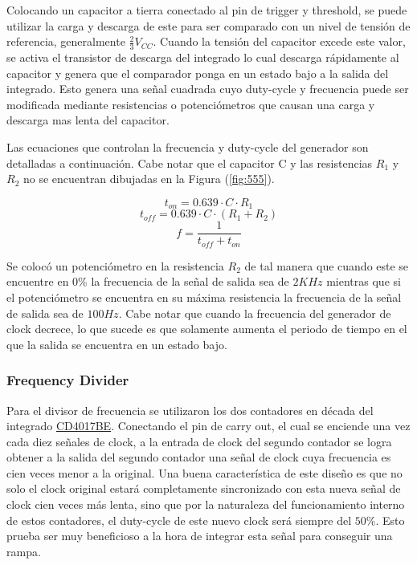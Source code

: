 Colocando un capacitor a tierra conectado al pin de trigger y threshold, se puede utilizar la carga y descarga de este para ser comparado con un nivel de tensión de referencia, generalmente $\frac{2}{3} V_{CC}$. Cuando la tensión del capacitor excede este valor, se activa el transistor de descarga del integrado lo cual descarga rápidamente al capacitor y genera que el comparador ponga en un estado bajo a la salida del integrado. Esto genera una señal cuadrada cuyo duty-cycle y frecuencia puede ser modificada mediante resistencias o potenciómetros que causan una carga y descarga mas lenta del capacitor. 

Las ecuaciones que controlan la frecuencia y duty-cycle del generador son detalladas a continuación. Cabe notar que el capacitor C y las resistencias $R_1$ y $R_2$ no se encuentran dibujadas en la Figura (\ref{fig:555}).

\begin{equation}
t_{on} = 0.639\cdot C \cdot R_1
\end{equation}
\begin{equation}
t_{off} = 0.639 \cdot C \cdot (R_1 + R_2)
\end{equation}
\begin{equation}
f=\frac{1}{t_{off} + t_{on}}
\end{equation}

Se colocó un potenciómetro en la resistencia $R_2$ de tal manera que cuando este se encuentre en $0\%$ la frecuencia de la señal de salida sea de $2KHz$ mientras que si el potenciómetro se encuentra en su máxima resistencia la frecuencia de la señal de salida sea de $100Hz$. Cabe notar que cuando la frecuencia del generador de clock decrece, lo que sucede es que solamente aumenta el periodo de tiempo en el que la salida se encuentra en un estado bajo.

\subsubsection{Frequency Divider}

Para el divisor de frecuencia se utilizaron los dos contadores en década del integrado \href{http://www.ti.com/lit/ds/symlink/cd4017b.pdf}{CD4017BE}. Conectando el pin de carry out, el cual se enciende una vez cada diez señales de clock, a la entrada de clock del segundo contador se logra obtener a la salida del segundo contador una señal de clock cuya frecuencia es cien veces menor a la original. Una buena característica de este diseño es que no solo el clock original estará completamente sincronizado con esta nueva señal de clock cien veces más lenta, sino que por la naturaleza del funcionamiento interno de estos contadores, el duty-cycle de este nuevo clock será siempre del $50\%$. Esto prueba ser muy beneficioso a la hora de integrar esta señal para conseguir una rampa.

